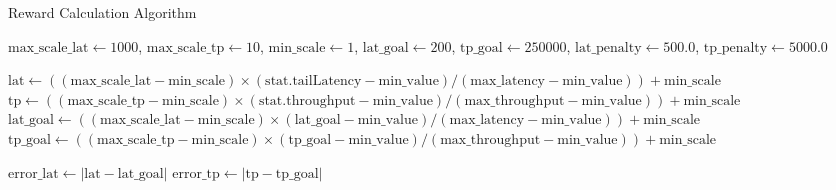 \begin{algorithm}
  \caption{Reward Calculation Algorithm}
  \label{algo:reward_calculation}
  \SetAlgoLined
  $\text{max\_scale\_lat} \leftarrow 1000$, $\text{max\_scale\_tp} \leftarrow 10$, $\text{min\_scale} \leftarrow 1$, $\text{lat\_goal} \leftarrow 200$, $\text{tp\_goal} \leftarrow 250000$, $\text{lat\_penalty} \leftarrow 500.0$, $\text{tp\_penalty} \leftarrow 5000.0$\;
    
  $\text{lat} \leftarrow ((\text{max\_scale\_lat} - \text{min\_scale}) \times (\text{stat.tailLatency} - \text{min\_value}) / (\text{max\_latency} - \text{min\_value})) + \text{min\_scale}$\;
  $\text{tp} \leftarrow ((\text{max\_scale\_tp} - \text{min\_scale}) \times (\text{stat.throughput} - \text{min\_value}) / (\text{max\_throughput} - \text{min\_value})) + \text{min\_scale}$\;
  $\text{lat\_goal} \leftarrow ((\text{max\_scale\_lat} - \text{min\_scale}) \times (\text{lat\_goal} - \text{min\_value}) / (\text{max\_latency} - \text{min\_value})) + \text{min\_scale}$\;
  $\text{tp\_goal} \leftarrow ((\text{max\_scale\_tp} - \text{min\_scale}) \times (\text{tp\_goal} - \text{min\_value}) / (\text{max\_throughput} - \text{min\_value})) + \text{min\_scale}$\;
    
  $\text{error\_lat} \leftarrow |\text{lat} - \text{lat\_goal}|$\;
  $\text{error\_tp} \leftarrow |\text{tp} - \text{tp\_goal}|$\;
    
\end{algorithm}

